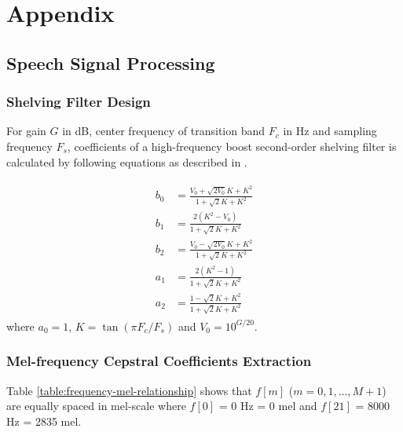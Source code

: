 \appendix
\chapter{Appendix}


\section{Speech Signal Processing}

\subsection{Shelving Filter Design}
\label{shelving-appendix}
For gain $G$ in dB, center frequency of transition band $F_c$ in Hz and sampling frequency $F_s$, coefficients of a high-frequency boost second-order shelving filter is calculated by following equations as described in \cite{DAFX_book}.

\begin{align}
\begin{split}
b_0 &= \frac{V_0 + \sqrt{2V_0} K + K^2}{1 + \sqrt{2} K + K^2}\\
b_1 &= \frac{2 (K^2 - V_0)}{1 + \sqrt{2} K + K^2}\\
b_2 &= \frac{V_0 - \sqrt{2V_0} K + K^2}{1 + \sqrt{2} K + K^2}\\
a_1 &= \frac{2 (K^2 - 1)}{1 + \sqrt{2} K + K^2}\\
a_2 &= \frac{1 - \sqrt{2}K + K^2}{1 + \sqrt{2}K + K^2}
\end{split}
\end{align}
where $a_0 = 1$, $K = \tan(\pi F_c / F_s)$ and $V_0 = 10^{G/20}$.


\subsection{Mel-frequency Cepstral Coefficients Extraction}

Table \ref{table:frequency-mel-relationship} shows that $f[m]$ ($m = 0, 1, \dots, M+1$) are equally spaced in mel-scale where $f[0]$ = 0 Hz = 0 mel and $f[21]$ = 8000 Hz = 2835 mel.

